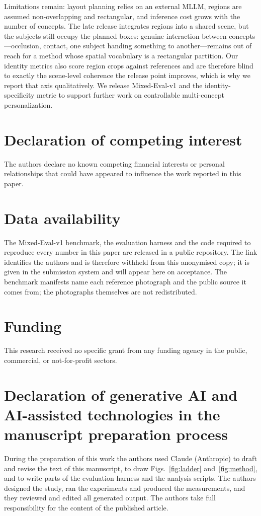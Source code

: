 \documentclass[review,10pt,times]{elsarticle}
\begin{document}
Limitations remain: layout planning relies on an external MLLM,
regions are assumed non-overlapping and rectangular, and inference cost
grows with the number of concepts.  The late release integrates regions
into a shared scene, but the subjects still occupy the planned boxes:
genuine interaction between concepts---occlusion, contact, one subject
handing something to another---remains out of reach for a method whose
spatial vocabulary is a rectangular partition.  Our identity metrics
also score region crops against references and are therefore blind to
exactly the scene-level coherence the release point improves, which is
why we report that axis qualitatively.  We release Mixed-Eval-v1 and
the identity-specificity metric to support further work on controllable
multi-concept personalization.

\section*{Declaration of competing interest}
The authors declare no known competing financial interests or personal
relationships that could have appeared to influence the work reported in this
paper.

\section*{Data availability}
The Mixed-Eval-v1 benchmark, the evaluation harness and the code required to
reproduce every number in this paper are released in a public repository.  The
link identifies the authors and is therefore withheld from this anonymised
copy; it is given in the submission system and will appear here on acceptance.
The benchmark manifests name each reference photograph and the public source
it comes from; the photographs themselves are not redistributed.

\section*{Funding}
This research received no specific grant from any funding agency in the
public, commercial, or not-for-profit sectors.

\section*{Declaration of generative AI and AI-assisted technologies in the
manuscript preparation process}
During the preparation of this work the authors used Claude (Anthropic) to
draft and revise the text of this manuscript, to draw
Figs.~\ref{fig:ladder} and~\ref{fig:method}, and to write parts of the
evaluation harness and the analysis scripts.  The authors designed the
study, ran the experiments and produced the measurements, and they reviewed
and edited all generated output.  The authors take full responsibility for
the content of the published article.



\end{document}
